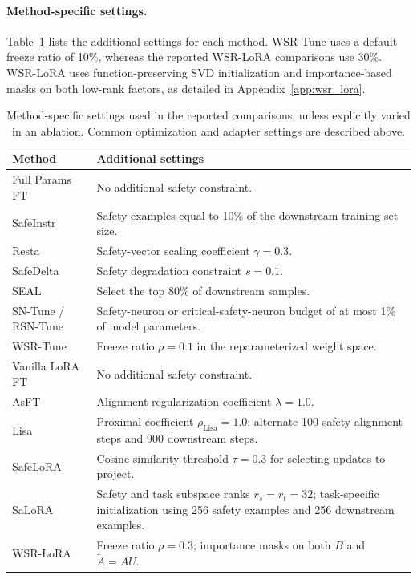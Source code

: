 \documentclass{article}
\begin{document}
\paragraph{Method-specific settings.}
Table~\ref{tab:method_hyperparameters} lists the additional settings for each method. WSR-Tune uses a default freeze ratio of 10\%, whereas the reported WSR-LoRA comparisons use 30\%. WSR-LoRA uses function-preserving SVD initialization and importance-based masks on both low-rank factors, as detailed in Appendix~\ref{app:wsr_lora}.

\begin{table}[htbp]
\centering
\small
\caption{Method-specific settings used in the reported comparisons, unless explicitly varied in an ablation. Common optimization and adapter settings are described above.}
\label{tab:method_hyperparameters}
\renewcommand{\arraystretch}{1.15}
\begin{tabular}{@{}>{\raggedright\arraybackslash}p{}>{\raggedright\arraybackslash}p{}@{}}
\toprule
\textbf{Method} & \textbf{Additional settings} \\
\midrule
Full Params FT & No additional safety constraint. \\
SafeInstr & Safety examples equal to 10\% of the downstream training-set size. \\
Resta & Safety-vector scaling coefficient $\gamma=0.3$. \\
SafeDelta & Safety degradation constraint $s=0.1$. \\
SEAL & Select the top 80\% of downstream samples. \\
SN-Tune / RSN-Tune & Safety-neuron or critical-safety-neuron budget of at most 1\% of model parameters. \\
WSR-Tune & Freeze ratio $\rho=0.1$ in the reparameterized weight space. \\
\midrule
Vanilla LoRA FT & No additional safety constraint. \\
AsFT & Alignment regularization coefficient $\lambda=1.0$. \\
Lisa & Proximal coefficient $\rho_{\mathrm{Lisa}}=1.0$; alternate 100 safety-alignment steps and 900 downstream steps. \\
SafeLoRA & Cosine-similarity threshold $\tau=0.3$ for selecting updates to project. \\
SaLoRA & Safety and task subspace ranks $r_s=r_t=32$; task-specific initialization using 256 safety examples and 256 downstream examples. \\
WSR-LoRA & Freeze ratio $\rho=0.3$; importance masks on both $B$ and $\widetilde A=AU$. \\
\bottomrule
\end{tabular}
\end{table}
\end{document}
